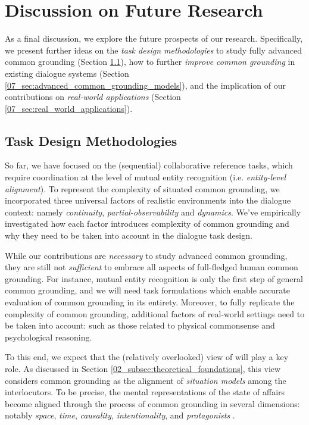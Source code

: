 \graphicspath{{07_discussion/figures/}} %

\chapter{Discussion on Future Research}
\label{07_chp:discussion}

As a final discussion, we explore the future prospects of our research. Specifically, we present further ideas on the \textit{task design methodologies} to study fully advanced common grounding (Section \ref{07_sec:task_design}), how to further \textit{improve common grounding} in existing dialogue systems (Section \ref{07_sec:advanced_common_grounding_models}), and the implication of our contributions on \textit{real-world applications} (Section \ref{07_sec:real_world_applications}).

\section{Task Design Methodologies}
\label{07_sec:task_design}

So far, we have focused on the (sequential) collaborative reference tasks, which require coordination at the level of mutual entity recognition (i.e. \textit{entity-level alignment}). To represent the complexity of situated common grounding, we incorporated three universal factors of realistic environments into the dialogue context: namely \textit{continuity}, \textit{partial-observability} and \textit{dynamics}. We've empirically investigated how each factor introduces complexity of common grounding and why they need to be taken into account in the dialogue task design.

While our contributions are \textit{necessary} to study advanced common grounding, they are still not \textit{sufficient} to embrace all aspects of full-fledged human common grounding. For instance, mutual entity recognition is only the first step of general common grounding, and we will need task formulations which enable accurate evaluation of common grounding in its entirety. Moreover, to fully replicate the complexity of common grounding, additional factors of real-world settings need to be taken into account: such as those related to physical commonsense and psychological reasoning.

To this end, we expect that the (relatively overlooked) view of \citet{pickering2004toward} will play a key role. As discussed in Section \ref{02_subsec:theoretical_foundations}, this view considers common grounding as the alignment of \textit{situation models} among the interlocutors. To be precise, the mental representations of the state of affairs become aligned through the process of common grounding in several dimensions: notably \textit{space}, \textit{time}, \textit{causality}, \textit{intentionality}, and \textit{protagonists} \citep{zwaan1998situation}.

